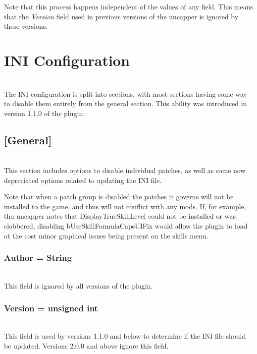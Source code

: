 \documentclass[12pt]{amsart}
\begin{document}
Note that this process happens independent of the values of any field. This
means that the \textit{Version} field used in previous versions of the uncapper
is ignored by these versions.
\stopblock

\startblock
\section{INI Configuration}\hfill\\

The INI configuration is split into sections, with most sections having some
way to disable them entirely from the general section. This ability was
introduced in version 1.1.0 of the plugin.
\stopblock

\startblock
\subsection{[General]}\hfill\\

This section includes options to disable individual patches, as well as some
now depreciated options related to updating the INI file.

Note that when a patch group is disabled the patches it governs will not be
installed to the game, and thus will not conflict with any mods. If, for
example, thu uncapper notes that DisplayTrueSkillLevel could not be installed
or was clobbered, disabling bUseSkillFormulaCapsUIFix would allow the plugin
to load at the cost minor graphical issues being present on the skills menu.
\stopblock

\startblock
\subsubsection{Author = \textlangle String\textrangle}\hfill\\

This field is ignored by all versions of the plugin.
\stopblock

\startblock
\subsubsection{Version = \textlangle unsigned int\textrangle}\hfill\\

This field is used by versions 1.1.0 and below to determine if the INI file
should be updated. Versions 2.0.0 and above ignore this field.
\stopblock

\startblock
\end{document}
